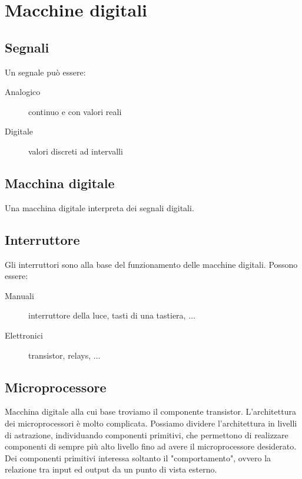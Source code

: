 \documentclass{article}
\begin{document}
\section{Macchine digitali}

\subsection{Segnali}

Un segnale può essere:

\begin{description}
	\item[Analogico] continuo e con valori reali
	\item[Digitale] valori discreti ad intervalli
\end{description}

\subsection{Macchina digitale}

Una macchina digitale interpreta dei segnali digitali.

\subsection{Interruttore}

Gli interruttori sono alla base del funzionamento delle macchine digitali. Possono essere:

\begin{description}
	\item[Manuali] interruttore della luce, tasti di una tastiera, $\dots$
	\item[Elettronici] transistor, relays, $\dots$
\end{description}

\subsection{Microprocessore}

Macchina digitale alla cui base troviamo il componente transistor.
L'architettura dei microprocessori è molto complicata.
Possiamo dividere l'architettura in livelli di astrazione, individuando componenti primitivi, che permettono di realizzare componenti di sempre più alto livello fino ad avere il microprocessore desiderato.
Dei componenti primitivi interessa soltanto il "comportamento", ovvero la relazione tra input ed output da un punto di vista esterno.
\end{document}
